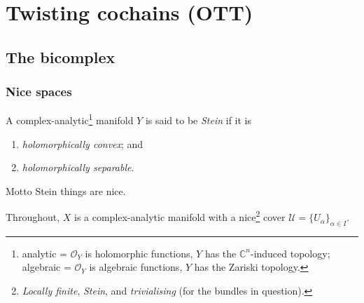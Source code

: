 \documentclass{beamer}
\begin{document}
    \section{Twisting cochains (OTT)}

        \subsection{The bicomplex}

            \begin{frame}\frametitle{Nice spaces}
                \begin{definition}
                    A complex-analytic\footnote{analytic = $\mathcal{O}_Y$ is holomorphic functions, $Y$ has the $\mathbb{C}^n$-induced topology; algebraic = $\mathcal{O}_Y$ is algebraic functions, $Y$ has the Zariski topology.} manifold $Y$ is said to be \emph{Stein} if it is
                    \begin{enumerate}
                        \item \emph{holomorphically convex}; and
                        \item \emph{holomorphically separable}.
                    \end{enumerate}
                \end{definition}

                \pause

                \begin{block}{Motto}
                    Stein things are nice.
                \end{block}

                \pause

                Throughout, $X$ is a complex-analytic manifold with a nice\footnote{\emph{Locally finite}, \emph{Stein}, and \emph{trivialising} (for the bundles in question).} cover $\mathcal{U}=\{U_\alpha\}_{\alpha\in I}$.
            \end{frame}
\end{document}
